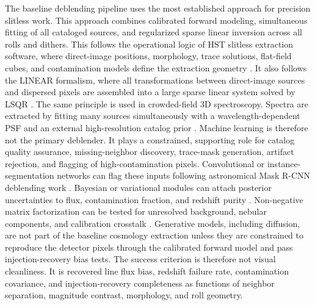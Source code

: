 \documentclass[10pt,onecolumn]{article}
\begin{document}
The baseline deblending pipeline uses the most established approach for precision slitless work. This approach combines calibrated forward modeling, simultaneous fitting of all cataloged sources, and regularized sparse linear inversion across all rolls and dithers. This follows the operational logic of HST slitless extraction software, where direct-image positions, morphology, trace solutions, flat-field cubes, and contamination models define the extraction geometry \cite{axe2009}. It also follows the LINEAR formalism, where all transformations between direct-image sources and dispersed pixels are assembled into a large sparse linear system solved by LSQR \cite{linear2018}. The same principle is used in crowded-field 3D spectroscopy. Spectra are extracted by fitting many sources simultaneously with a wavelength-dependent PSF and an external high-resolution catalog prior \cite{kamann2013,husser2016}. Machine learning is therefore not the primary deblender. It plays a constrained, supporting role for catalog quality assurance, missing-neighbor discovery, trace-mask generation, artifact rejection, and flagging of high-contamination pixels. Convolutional or instance-segmentation networks can flag these inputs following astronomical Mask R-CNN deblending work \cite{burke2019}. Bayesian or variational modules can attach posterior uncertainties to flux, contamination fraction, and redshift purity \cite{liu2021}. Non-negative matrix factorization can be tested for unresolved background, nebular components, and calibration crosstalk \cite{horstman2022}. Generative models, including diffusion, are not part of the baseline cosmology extraction unless they are constrained to reproduce the detector pixels through the calibrated forward model and pass injection-recovery bias tests. The success criterion is therefore not visual cleanliness. It is recovered line flux bias, redshift failure rate, contamination covariance, and injection-recovery completeness as functions of neighbor separation, magnitude contrast, morphology, and roll geometry.
\end{document}
